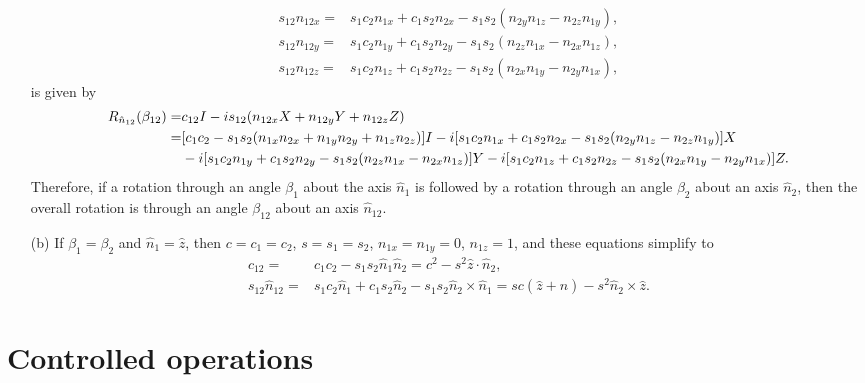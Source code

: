 \documentclass[en]{sol-man}
\begin{document}
\begin{pf}
\begin{itemize}
\begin{align}
            s_{12}n_{12x}=&s_1c_2n_{1x}+c_1s_2n_{2x}-s_1s_2(n_{2y}n_{1z}-n_{2z}n_{1y}),\\
            s_{12}n_{12y}=&s_1c_2n_{1y}+c_1s_2n_{2y}-s_1s_2(n_{2z}n_{1x}-n_{2x}n_{1z}),\\
            s_{12}n_{12z}=&s_1c_2n_{1z}+c_1s_2n_{2z}-s_1s_2(n_{2x}n_{1y}-n_{2y}n_{1x}),
        \end{align}
        is given by
        \begin{align}
            \notag R_{\hat{n}_{12}}(\beta_{12})=&c_{12}I-is_{12}(n_{12x}X+n_{12y}Y+n_{12z}Z)\\
            \notag=&[c_1c_2-s_1s_2(n_{1x}n_{2x}+n_{1y}n_{2y}+n_{1z}n_{2z})]I-i[s_1c_2n_{1x}+c_1s_2n_{2x}-s_1s_2(n_{2y}n_{1z}-n_{2z}n_{1y})]X\\
            &-i[s_1c_2n_{1y}+c_1s_2n_{2y}-s_1s_2(n_{2z}n_{1x}-n_{2x}n_{1z})]Y-i[s_1c_2n_{1z}+c_1s_2n_{2z}-s_1s_2(n_{2x}n_{1y}-n_{2y}n_{1x})]Z.
        \end{align}
        Therefore, if a rotation through an angle $\beta_1$ about the axis $\hat{n}_1$ is followed by a rotation through an angle $\beta_2$ about an axis $\hat{n}_2$, then the overall rotation is through an angle $\beta_{12}$ about an axis $\hat{n}_{12}$.
        \item[(b)] If $\beta_1=\beta_2$ and $\hat{n}_1=\hat{z}$, then $c=c_1=c_2$, $s=s_1=s_2$, $n_{1x}=n_{1y}=0$, $n_{1z}=1$, and these equations simplify to
        \begin{align}
            c_{12}=&c_1c_2-s_1s_2\hat{n}_1\hat{n}_2=c^2-s^2\hat{z}\cdot\hat{n}_2,\\
            s_{12}\hat{n}_{12}=&s_1c_2\hat{n}_1+c_1s_2\hat{n}_2-s_1s_2\hat{n}_2\times\hat{n}_1=sc(\hat{z}+\hat{n})-s^2\hat{n}_2\times\hat{z}.
        \end{align}
    \end{itemize}
\end{pf}

\section{Controlled operations}
\end{document}
